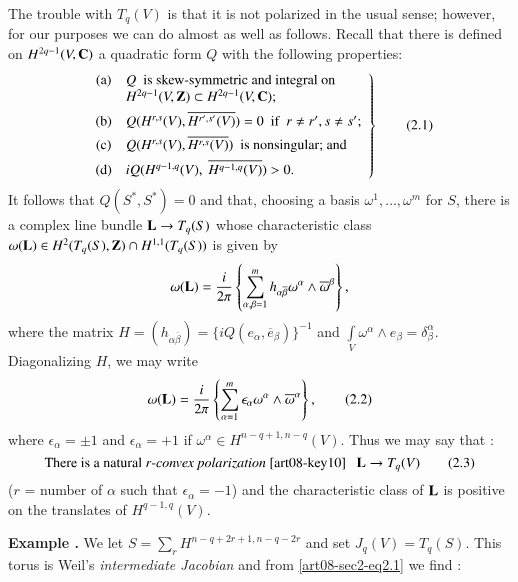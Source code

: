 The trouble with $T_{q}(V)$ is that it is not polarized in the usual sense; however, for our purposes we can do almost as well as follows. Recall \cite{art08-key23} that there is defined on $H^{2q-1}(V,\mathbf{C})$ a quadratic form $Q$ with the following properties:
\begin{equation*}
\left.
\begin{array}{cl}
{\rm(a)} & Q \text{~ is skew-symmetric and integral on ~}\\
         & H^{2q-1}(V,\mathbf{Z})\subset H^{2q-1}(V,\mathbf{C});\\[4pt]
{\rm(b)} & Q(H^{r,s}(V),\overline{H^{r',s'}(V)})=0\text{~ if~ } r\neq r', s\neq s';\\[4pt]
{\rm(c)} & Q(H^{r,s}(V),\overline{H^{r,s}(V)})\text{~ is nonsingular; and}\\[4pt]
{\rm(d)} & iQ(H^{q-1,q}(V), \ \overline{H^{q-1,q}(V)})>0.
\end{array}
\right\}\tag{2.1}\label{art08-sec2-eq2.1}
\end{equation*}
It follows that $Q(S^{*},S^{*})=0$ and that, choosing a basis $\omega^{1},\ldots,\omega^{m}$ for $S$, there is a complex line bundle $\mathbf{L}\to T_{q}(S)$ whose characteristic class $\omega(\mathbf{L})\in H^{2}(T_{q}(S),\mathbf{Z})\cap H^{1,1}(T_{q}(S))$ is given by
$$
\omega(\mathbf{L})=\dfrac{i}{2\pi}\left\{\sum\limits^{m}_{\alpha,\beta=1}h_{\alpha\overline{\beta}}\omega^{\alpha}\wedge \overline{\omega}^{\beta}\right\},
$$
where the matrix $H=(h_{\alpha\overline{\beta}})=\{iQ(e_{\alpha},\overline{e}_{\beta})\}^{-1}$ and $\int\limits_{V}\omega^{\alpha}\wedge e_{\beta}=\delta^{\alpha}_{\beta}$. Diagonalizing $H$, we may write
\begin{equation*}
\omega(\mathbf{L})=\dfrac{i}{2\pi}\left\{\sum\limits^{m}_{\alpha=1}\epsilon_{\alpha}\omega^{\alpha}\wedge \overline{\omega}^{\alpha}\right\},\tag{2.2}\label{art08-sec2-eq2.2}
\end{equation*}
where $\epsilon_{\alpha}=\pm 1$ and $\epsilon_{\alpha}=+1$ if $\omega^{\alpha}\in H^{n-q+1,n-q}(V)$. Thus we may say that :
\begin{equation*}
\text{There is a natural } r\text{-{\em convex polarization} \cite{art08-key10}~~ } \mathbf{L}\to T_{q}(V)\tag{2.3}\label{art08-sec2-eq2.3}
\end{equation*}\pageoriginale
($r$ = number of $\alpha$ such that $\epsilon_{\alpha}=-1$) and the characteristic class of $\mathbf{L}$ is positive on the translates of $H^{q-1,q}(V)$.

\medskip
\noindent
{\bf Example .\label{art08-exam2}}
We let $S=\sum\limits_{r} H^{n-q+2r+1,n-q-2r}$ and set $J_{q}(V)=T_{q}(S)$. This torus is Weil's {\em intermediate Jacobian} \cite{art08-key22} and from \eqref{art08-sec2-eq2.1} we find :
\smallskip

